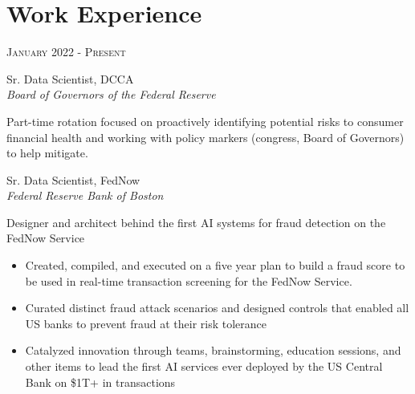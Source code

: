 \documentclass[10pt]{article} %
\begin{document}
\begin{minipage}[t]{0.5\textwidth} %
\vspace{0pt} %
	

\section{Work Experience} 

{\raggedleft\textsc{January 2022 - Present}\par}

{\raggedright\large Sr. Data Scientist,  DCCA\\ 
\textit{Board of Governors of the Federal Reserve}\\[5pt]}

\normalsize{Part-time rotation focused on proactively identifying potential risks to consumer financial health and working with policy markers (congress, Board of Governors) to help mitigate.} \\


{\raggedright\large Sr. Data Scientist,  FedNow\\ 
\textit{Federal Reserve Bank of Boston}\\[5pt]}

\normalsize{Designer and architect behind the first AI systems for fraud detection on the FedNow Service     \\

\begin{itemize}
\item Created, compiled, and executed on a five year plan to build a fraud score to be used in real-time transaction screening for the FedNow Service. 
\item Curated distinct fraud attack scenarios and designed controls that enabled all US banks to prevent fraud at their risk tolerance
\item Catalyzed innovation through teams, brainstorming, education sessions, and other items to lead the first AI services ever deployed by the US Central Bank on \$1T+ in transactions
\end{itemize}}


\end{minipage}
\end{document}
